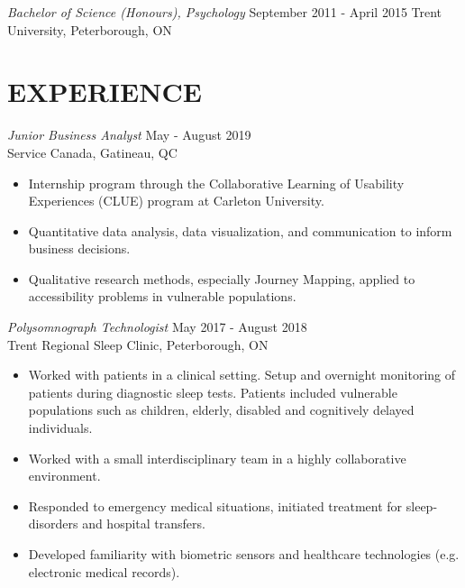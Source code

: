 \documentclass[10pt]{res} %
\begin{document}
\begin{resume}
{\sl Bachelor of Science (Honours), Psychology} \hfill September 2011 - April 2015\newline
Trent University, Peterborough, ON



\section{EXPERIENCE}

{\sl Junior Business Analyst} \hfill May - August 2019 \\
Service Canada, Gatineau, QC
\begin{itemize}\itemsep -2pt %
    \item Internship program through the Collaborative Learning of Usability Experiences (CLUE) program at Carleton University.
    \item Quantitative data analysis, data visualization, and communication to inform business decisions.
    \item Qualitative research methods, especially Journey Mapping, applied to accessibility problems in vulnerable populations.
\end{itemize}


{\sl Polysomnograph Technologist} \hfill May 2017 - August 2018 \\
Trent Regional Sleep Clinic, Peterborough, ON
\begin{itemize}\itemsep -2pt %
    \item Worked with patients in a clinical setting. Setup and overnight monitoring of patients during diagnostic sleep tests. Patients included vulnerable populations such as children, elderly, disabled and cognitively delayed individuals.
    \item Worked with a small interdisciplinary team in a highly collaborative environment.
    \item Responded to emergency medical situations, initiated treatment for sleep-disorders and hospital transfers.
    \item Developed familiarity with biometric sensors and healthcare technologies (e.g. electronic medical records).
\end{itemize}


\end{resume}
\end{document}
